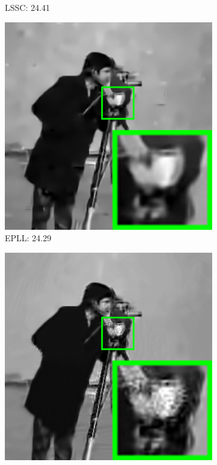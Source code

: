 \begin{figure}
\begin{subfigure}[t]{0.24\textwidth}
		\caption{LSSC: 24.41}
    \end{subfigure}
    \hfill
    \begin{subfigure}[t]{0.24\textwidth}
        \centering
        \includegraphics[width=1\textwidth]{images/pgpd/br_EPLL_75_cameraman.png}
		\caption{EPLL: 24.29}
    \end{subfigure}
    \hfill
    \begin{subfigure}[t]{0.24\textwidth}
        \centering
        \includegraphics[width=1\textwidth]{images/pgpd/br_NCSR_75_cameraman.png}

\end{subfigure}
\end{figure}
